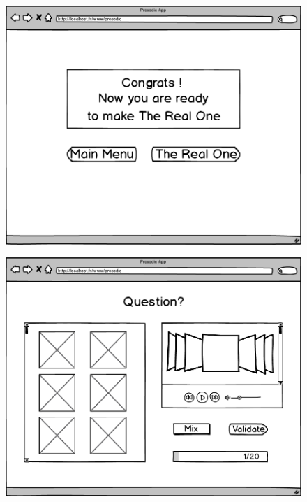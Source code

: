 \documentclass[a4paper,twoside,10pt]{report}
\begin{document}
 \begin{figure}[ht]
  \includegraphics[width=\textwidth]{F-4.png}
 \end{figure}
 
 \begin{figure}[ht]
  \includegraphics[width=\textwidth]{T-1.png}
 \end{figure}
 
\end{document}
